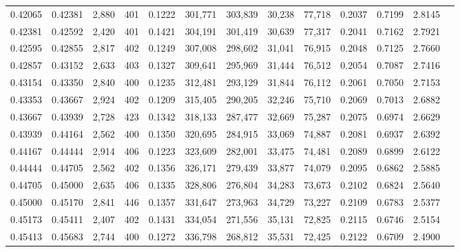 \begin{tabular}{rrrrrrrrrrrrr}
0.42065 & 0.42381 &  2,880 &   401 &                                     0.1222 & 301,771 & 303,839 &  30,238 &  77,718 & 0.2037 & 0.7199 & 2.8145 \\
0.42381 & 0.42592 &  2,420 &   401 &                                     0.1421 & 304,191 & 301,419 &  30,639 &  77,317 & 0.2041 & 0.7162 & 2.7921 \\
0.42595 & 0.42855 &  2,817 &   402 &                                     0.1249 & 307,008 & 298,602 &  31,041 &  76,915 & 0.2048 & 0.7125 & 2.7660 \\
0.42857 & 0.43152 &  2,633 &   403 &                                     0.1327 & 309,641 & 295,969 &  31,444 &  76,512 & 0.2054 & 0.7087 & 2.7416 \\
0.43154 & 0.43350 &  2,840 &   400 &                                     0.1235 & 312,481 & 293,129 &  31,844 &  76,112 & 0.2061 & 0.7050 & 2.7153 \\
0.43353 & 0.43667 &  2,924 &   402 &                                     0.1209 & 315,405 & 290,205 &  32,246 &  75,710 & 0.2069 & 0.7013 & 2.6882 \\
0.43667 & 0.43939 &  2,728 &   423 &                                     0.1342 & 318,133 & 287,477 &  32,669 &  75,287 & 0.2075 & 0.6974 & 2.6629 \\
0.43939 & 0.44164 &  2,562 &   400 &                                     0.1350 & 320,695 & 284,915 &  33,069 &  74,887 & 0.2081 & 0.6937 & 2.6392 \\
0.44167 & 0.44444 &  2,914 &   406 &                                     0.1223 & 323,609 & 282,001 &  33,475 &  74,481 & 0.2089 & 0.6899 & 2.6122 \\
0.44444 & 0.44705 &  2,562 &   402 &                                     0.1356 & 326,171 & 279,439 &  33,877 &  74,079 & 0.2095 & 0.6862 & 2.5885 \\
0.44705 & 0.45000 &  2,635 &   406 &                                     0.1335 & 328,806 & 276,804 &  34,283 &  73,673 & 0.2102 & 0.6824 & 2.5640 \\
0.45000 & 0.45170 &  2,841 &   446 &                                     0.1357 & 331,647 & 273,963 &  34,729 &  73,227 & 0.2109 & 0.6783 & 2.5377 \\
0.45173 & 0.45411 &  2,407 &   402 &                                     0.1431 & 334,054 & 271,556 &  35,131 &  72,825 & 0.2115 & 0.6746 & 2.5154 \\
0.45413 & 0.45683 &  2,744 &   400 &                                     0.1272 & 336,798 & 268,812 &  35,531 &  72,425 & 0.2122 & 0.6709 & 2.4900 \\

\end{tabular}
